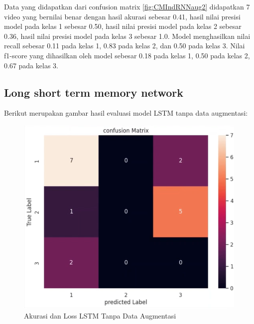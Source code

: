 Data yang didapatkan dari confusion matrix \ref{fig:CMIndRNNaug2} didapatkan 7 video yang bernilai benar
dengan hasil akurasi sebesar 0.41, hasil nilai presisi model pada kelas 1 sebesar 0.50, hasil nilai
presisi model pada kelas 2 sebesar 0.36, hasil nilai presisi model pada kelas 3 sebesar 1.0. Model menghasilkan
nilai recall sebesar 0.11 pada kelas 1, 0.83 pada kelas 2, dan 0.50 pada kelas 3. Nilai f1-score yang dihasilkan
oleh model sebesar 0.18 pada kelas 1, 0.50 pada kelas 2, 0.67 pada kelas 3.

\subsection{Long short term memory network}

Berikut merupakan gambar hasil evaluasi model LSTM tanpa data augmentasi:
\newpage
\begin{figure} [H] \centering
  \includegraphics[scale=1.3]{gambar/CMLSTMnoAug2.png}
  \caption{Akurasi dan Loss LSTM Tanpa Data Augmentasi}
  \label{fig:CMLSTMnoaug2}
\end{figure}

